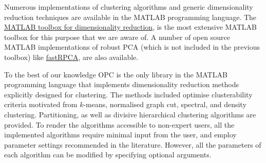 \documentclass{book}
\begin{document}
%


Numerous implementations of clustering algorithms and generic dimensionality
reduction techniques are available in the MATLAB programming language.
%
The 
%
\href{https://lvdmaaten.github.io/drtoolbox/}{MATLAB toolbox for dimensionality reduction}, 
%
is the most extensive MATLAB toolbox for this purpose that we are aware of.
%
A number of open source MATLAB implementations of robust PCA (which is not included
in the previous toolbox)
like
%
\href{https://github.com/stephenbeckr/fastRPCA}{fastRPCA},
%
are also available.


To the best of our knowledge OPC is the only library in the MATLAB programming
language that implements dimensionality reduction methods explicitly designed
for clustering.
%
The methods included optimise clusterability criteria motivated from $k$-means,
normalised graph cut, spectral, and density clustering.
%
Partitioning, as well as divisive hierarchical clustering algorithms are
provided. 
%
To render the algorithms accessible to non-expert users,
all the implemented algorithms require minimal input from the user, and employ
parameter settings recommended in the literature. However,
all the parameters of each algorithm can be modified
by specifying optional arguments.
\end{document}
